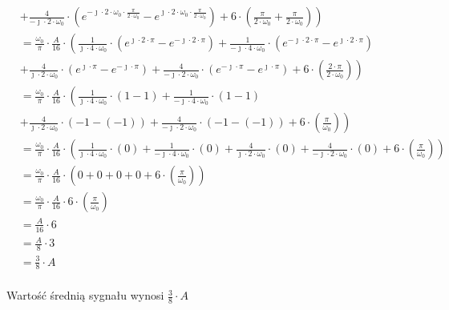 \begin{task}
\begin{align*}
&\left.+\frac{4}{-\jmath \cdot 2 \cdot \omega_0} \cdot \left( e^{-\jmath \cdot 2 \cdot \omega_0 \cdot \frac{\pi}{2\cdot\omega_0}} - e^{\jmath \cdot 2 \cdot \omega_0 \cdot \frac{\pi}{2\cdot\omega_0}}\right) + 6 \cdot  \left( \frac{\pi}{2\cdot\omega_0} + \frac{\pi}{2\cdot\omega_0} \right)\right)\\
&=\frac{\omega_0}{\pi} \cdot \frac{A}{16} \cdot \left(\frac{1}{\jmath \cdot 4 \cdot \omega_0} \cdot \left( e^{\jmath \cdot 2 \cdot \pi} - e^{-\jmath \cdot 2 \cdot \pi}\right) +\frac{1}{-\jmath \cdot 4 \cdot \omega_0}\cdot \left( e^{-\jmath \cdot 2 \cdot \pi} - e^{\jmath \cdot 2 \cdot \pi}\right)\right.\\
&\left. +\frac{4}{\jmath \cdot 2 \cdot \omega_0}\cdot \left( e^{\jmath \cdot \pi} - e^{-\jmath \cdot \pi}\right) +\frac{4}{-\jmath \cdot 2 \cdot \omega_0} \cdot \left( e^{-\jmath \cdot \pi} - e^{\jmath \cdot \pi}\right) + 6 \cdot  \left( \frac{2 \cdot \pi}{2\cdot\omega_0} \right)\right)\\
&=\frac{\omega_0}{\pi} \cdot \frac{A}{16} \cdot \left(\frac{1}{\jmath \cdot 4 \cdot \omega_0} \cdot \left( 1 - 1\right) +\frac{1}{-\jmath \cdot 4 \cdot \omega_0}\cdot \left( 1 - 1\right)\right.\\
&\left. +\frac{4}{\jmath \cdot 2 \cdot \omega_0}\cdot \left( -1 - (-1)\right) +\frac{4}{-\jmath \cdot 2 \cdot \omega_0} \cdot \left(-1 - (-1)\right) + 6 \cdot  \left( \frac{\pi}{\omega_0} \right)\right)\\
&=\frac{\omega_0}{\pi} \cdot \frac{A}{16} \cdot \left(\frac{1}{\jmath \cdot 4 \cdot \omega_0} \cdot \left( 0\right) +\frac{1}{-\jmath \cdot 4 \cdot \omega_0}\cdot \left( 0\right) +\frac{4}{\jmath \cdot 2 \cdot \omega_0}\cdot \left( 0\right) +\frac{4}{-\jmath \cdot 2 \cdot \omega_0} \cdot \left(0\right) + 6 \cdot  \left( \frac{\pi}{\omega_0} \right)\right)\\
&=\frac{\omega_0}{\pi} \cdot \frac{A}{16} \cdot \left(0 +0 +0 +0 + 6 \cdot  \left( \frac{\pi}{\omega_0} \right)\right)\\
&=\frac{\omega_0}{\pi} \cdot \frac{A}{16} \cdot 6 \cdot  \left( \frac{\pi}{\omega_0} \right)\\
&= \frac{A}{16} \cdot 6\\
&= \frac{A}{8} \cdot 3\\
&= \frac{3}{8} \cdot A\\
\end{align*}

Wartość średnią sygnału wynosi $\frac{3}{8} \cdot A$
\end{task}